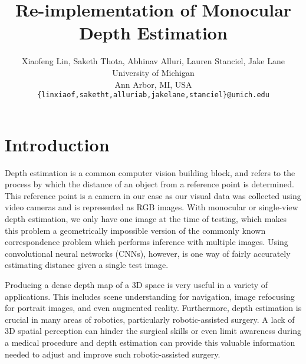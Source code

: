 \documentclass[10pt,twocolumn,letterpaper]{article}
\begin{document}
\title{Re-implementation of Monocular Depth Estimation}

\author{Xiaofeng Lin, Saketh Thota, Abhinav Alluri, Lauren Stanciel, Jake Lane\\
University of Michigan\\
Ann Arbor, MI, USA\\
{\tt\small \{linxiaof,saketht,alluriab,jakelane,stanciel\}@umich.edu}
}
\maketitle


\section{Introduction}
\label{sec:intro}

Depth estimation is a common computer vision building block, and refers to the
process by which the distance of an object from a reference point is determined.
This reference point is a camera in our case as our visual data was collected
using video cameras and is represented as RGB images. With monocular or
single-view depth estimation, we only have one image at the time of testing,
which makes this problem a geometrically impossible version of the commonly
known correspondence problem which performs inference with multiple images.
Using convolutional neural networks (CNNs), however, is one way of fairly
accurately estimating distance given a single test image.

Producing a dense depth map of a 3D space is very useful in a variety of
applications. This includes scene understanding for navigation, image refocusing
for portrait images, and even augmented reality. Furthermore, depth estimation
is crucial in many areas of robotics, particularly robotic-assisted surgery. A
lack of 3D spatial perception can hinder the surgical skills or even limit
awareness during a medical procedure and depth estimation can provide this
valuable information needed to adjust and improve such robotic-assisted surgery.
\end{document}
